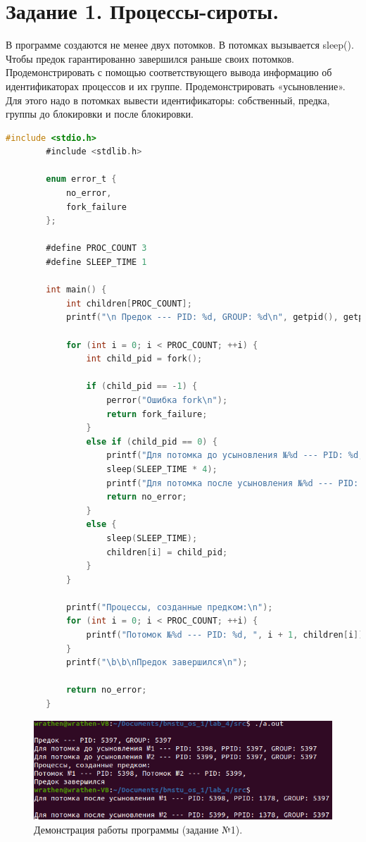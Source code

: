 \documentclass[12pt]{report}
\begin{document}
    
    
    \section*{Задание 1. Процессы-сироты.}
    В программе создаются не менее двух потомков.
    В потомках вызывается sleep().
    Чтобы предок гарантированно завершился раньше своих потомков.
    Продемонстрировать с помощью соответствующего вывода информацию об идентификаторах процессов и их группе.
    Продемонстрировать «усыновление».
    Для этого надо в потомках вывести идентификаторы:
    собственный, предка, группы до блокировки и после блокировки.
    
    \begin{lstlisting}[label=code:fork, caption=Процессы-сироты, language=C]
    	#include <stdio.h>
    	#include <stdlib.h>
    	
    	enum error_t {
    		no_error,
    		fork_failure
    	};
    	
    	#define PROC_COUNT 3
    	#define SLEEP_TIME 1
    	
    	int main() {
    		int children[PROC_COUNT];
    		printf("\n Предок --- PID: %d, GROUP: %d\n", getpid(), getpgrp());
    		
    		for (int i = 0; i < PROC_COUNT; ++i) {
    			int child_pid = fork();
    			
    			if (child_pid == -1) {
    				perror("Ошибка fork\n");
    				return fork_failure;
    			}
    			else if (child_pid == 0) {
    				printf("Для потомка до усыновления №%d --- PID: %d, PPID: %d, GROUP: %d\n", i + 1, getpid(), getppid(), getpgrp());
    				sleep(SLEEP_TIME * 4);
    				printf("Для потомка после усыновления №%d --- PID: %d, PPID: %d, GROUP: %d\n", i + 1, getpid(), getppid(), getpgrp());
    				return no_error;
    			}
    			else {
    				sleep(SLEEP_TIME);
    				children[i] = child_pid;
    			}
    		}
    		
    		printf("Процессы, созданные предком:\n");
    		for (int i = 0; i < PROC_COUNT; ++i) {
    			printf("Потомок №%d --- PID: %d, ", i + 1, children[i]);
    		}
    		printf("\b\b\nПредок завершился\n");
    		
    		return no_error;
    	}
    \end{lstlisting}

	\begin{figure}[H]
		
		\centering
		
		\includegraphics[width=\linewidth]{img/task_01.png}
		\caption{Демонстрация работы программы (задание №1).}
		
		\label{fig:task_01}
		
	\end{figure}
\end{document}
